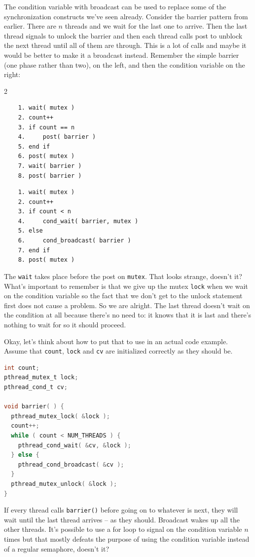 The condition variable with broadcast can be used to replace some of the synchronization constructs we've seen already. Consider the barrier pattern from earlier. There are $n$ threads and we wait for the last one to arrive. Then the last thread signals to unlock the barrier and then each thread calls post to unblock the next thread until all of them are through. This is a lot of calls and maybe it would be better to make it a broadcast instead. Remember the simple barrier (one phase rather than two), on the left, and then the condition variable on the right:

\begin{multicols}{2}
	\begin{verbatim}
	1. wait( mutex )
	2. count++
	3. if count == n
	4.     post( barrier )
	5. end if
	6. post( mutex )
	7. wait( barrier )
	8. post( barrier )
  \end{verbatim}
	\columnbreak
	\begin{verbatim}
	1. wait( mutex )
	2. count++
	3. if count < n
	4.     cond_wait( barrier, mutex )
	5. else 
	6.     cond_broadcast( barrier )
	7. end if
	8. post( mutex )
  \end{verbatim}
\end{multicols}

The \texttt{wait} takes place before the post on \texttt{mutex}. That looks strange, doesn't it? What's important to remember is that we give up the mutex \texttt{lock} when we wait on the condition variable so the fact that we don't get to the unlock statement first does not cause a problem. So we are alright. The last thread doesn't wait on the condition at all because there's no need to: it knows that it is last and there's nothing to wait for so it should proceed.

Okay, let's think about how to put that to use in an actual code example. Assume that \texttt{count}, \texttt{lock} and \texttt{cv} are initialized correctly as they should be.

\begin{lstlisting}[language=C]
int count;
pthread_mutex_t lock;
pthread_cond_t cv; 

void barrier( ) {
  pthread_mutex_lock( &lock );
  count++;
  while ( count < NUM_THREADS ) {
    pthread_cond_wait( &cv, &lock );
  } else {
    pthread_cond_broadcast( &cv );
  }
  pthread_mutex_unlock( &lock );
}
\end{lstlisting}

If every thread calls \texttt{barrier()} before going on to whatever is next, they will wait until the last thread arrives -- as they should. Broadcast wakes up all the other threads. It's possible to use a for loop to signal on the condition variable $n$ times but that mostly defeats the purpose of using the condition variable instead of a regular semaphore, doesn't it?

